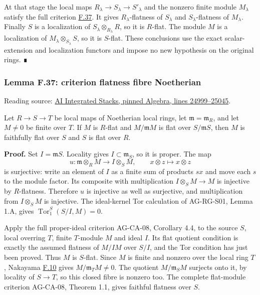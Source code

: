 \documentclass[11pt,a4paper,openany]{report}
\begin{document}
At that stage the local maps \(R_\lambda\to S_\lambda\to S'_\lambda\) and the nonzero finite module \(M_\lambda\) satisfy the full criterion \hyperref[AG-RG-S05-algebra-lemma-criterion-flatness-fibre-Noetherian]{F.37}. It gives \(R_\lambda\)-flatness of \(S_\lambda\) and \(S_\lambda\)-flatness of \(M_\lambda\). Finally \(S\) is a localization of \(S_\lambda\otimes_{R_\lambda}R\), so it is \(R\)-flat. The module \(M\) is a localization of \(M_\lambda\otimes_{S_\lambda}S\), so it is \(S\)-flat. These conclusions use the exact scalar-extension and localization functors and impose no new hypothesis on the original rings. ∎

\label{AG-RG-S05-algebra-lemma-criterion-flatness-fibre-Noetherian}

\subsubsection{Lemma F.37: criterion flatness fibre Noetherian}\label{AG-RG-S05-lemma-f.37-criterion-flatness-fibre-noetherian}

Reading source: \href{https://github.com/KokunoYumeto/unofficial-stacks-project-ai-drafts/blob/565b10e987aba5969b21145a0833f42d69f96790/algebra.tex\#L24999-L25045}{AI Integrated Stacks, pinned Algebra, lines 24999--25045}.

Let \(R\to S\to T\) be local maps of Noetherian local rings, let \(\mathfrak m=\mathfrak m_R\), and let \(M\ne0\) be finite over \(T\). If \(M\) is \(R\)-flat and \(M/\mathfrak mM\) is flat over \(S/\mathfrak mS\), then \(M\) is faithfully flat over \(S\) and \(S\) is flat over \(R\).

\textbf{Proof.} Set \(I=\mathfrak mS\). Locality gives \(I\subset\mathfrak m_S\), so it is proper. The map \[u:\mathfrak m\otimes_RM\longrightarrow I\otimes_SM,\qquad
x\otimes z\longmapsto x\otimes z\] is surjective: write an element of \(I\) as a finite sum of products \(sx\) and move each \(s\) to the module factor. Its composite with multiplication \(I\otimes_SM\to M\) is injective by \(R\)-flatness. Therefore \(u\) is injective as well as surjective, and multiplication from \(I\otimes_SM\) is injective. The ideal-kernel Tor calculation of AG-RG-S01, Lemma 1.A, gives \(\operatorname{Tor}_1^S(S/I,M)=0\).

Apply the full proper-ideal criterion AG-CA-08, Corollary 4.4, to the source \(S\), local overring \(T\), finite \(T\)-module \(M\) and ideal \(I\). Its flat quotient condition is exactly the assumed flatness of \(M/IM\) over \(S/I\), and the Tor condition has just been proved. Thus \(M\) is \(S\)-flat. Since \(M\) is finite and nonzero over the local ring \(T\), Nakayama \hyperref[AG-RG-S05-algebra-lemma-NAK]{F.10} gives \(M/\mathfrak m_TM\ne0\). The quotient \(M/\mathfrak m_SM\) surjects onto it, by locality of \(S\to T\), so this closed fibre is nonzero too. The complete flat-module criterion AG-CA-08, Theorem 1.1, gives faithful flatness over \(S\).
\end{document}
